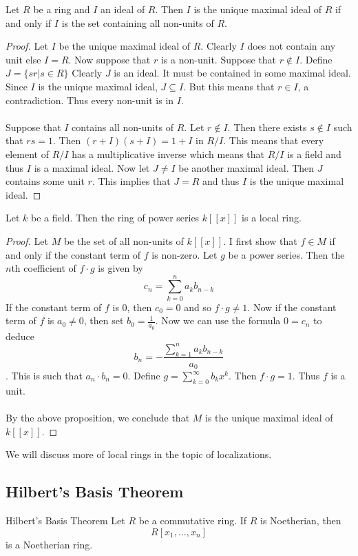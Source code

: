 \documentclass[a4paper]{article}
\begin{document}
\begin{prp}{}{} Let $R$ be a ring and $I$ an ideal of $R$. Then $I$ is the unique maximal ideal of $R$ if and only if $I$ is the set containing all non-units of $R$. \tcbline
\begin{proof}
Let $I$ be the unique maximal ideal of $R$. Clearly $I$ does not contain any unit else $I=R$. Now suppose that $r$ is a non-unit. Suppose that $r\notin I$. Define $J=\{sr|s\in R\}$ Clearly $J$ is an ideal. It must be contained in some maximal ideal. Since $I$ is the unique maximal ideal, $J\subseteq I$. But this means that $r\in I$, a contradiction. Thus every non-unit is in $I$. \\~\\
Suppose that $I$ contains all non-units of $R$. Let $r\notin I$. Then there exists $s\notin I$ such that $rs=1$. Then $(r+I)(s+I)=1+I$ in $R/I$. This means that every element of $R/I$ has a multiplicative inverse which means that $R/I$ is a field and thus $I$ is a maximal ideal. Now let $J\neq I$ be another maximal ideal. Then $J$ contains some unit $r$. This implies that $J=R$ and thus $I$ is the unique maximal ideal. 
\end{proof}
\end{prp}

\begin{eg}{}{} Let $k$ be a field. Then the ring of power series $k[[x]]$ is a local ring. \tcbline
\begin{proof}
Let $M$ be the set of all non-units of $k[[x]]$. I first show that $f\in M$ if and only if the constant term of $f$ is non-zero. Let $g$ be a power series. Then the $n$th coefficient of $f\cdot g$ is given by $$c_n=\sum_{k=0}^na_kb_{n-k}$$ If the constant term of $f$ is $0$, then $c_0=0$ and so $f\cdot g\neq 1$. Now if the constant term of $f$ is $a_0\neq 0$, then set $b_0=\frac{1}{a_0}$. Now we can use the formula $0=c_n$ to deduce $$b_n=-\frac{\sum_{k=1}^na_kb_{n-k}}{a_0}$$. This is such that $a_n\cdot b_n=0$. Define $g=\sum_{k=0}^\infty b_kx^k$. Then $f\cdot g=1$. Thus $f$ is a unit. \\~\\

By the above proposition, we conclude that $M$ is the unique maximal ideal of $k[[x]]$. 
\end{proof}
\end{eg}

We will discuss more of local rings in the topic of localizations. 

\subsection{Hilbert's Basis Theorem}
\begin{thm}{Hilbert's Basis Theorem}{} Let $R$ be a commutative ring. If $R$ is Noetherian, then $$R[x_1,\dots,x_n]$$ is a Noetherian ring. 
\end{thm}
\end{document}
